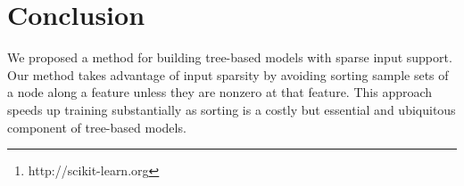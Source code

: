 \documentclass{acm_proc_article-sp}
\begin{document}
\maketitle
\begin{abstract}
  Many machine learning tasks such as text annotation usually require
  training over very big datasets, e.g., millions of web documents,
  that can be represented in a sparse input space. State-of-the-art
  tree-based ensemble algorithms cannot scale to such datasets, since
  they include operations whose running time is a function of the
  input space size rather than a function of the non-zero input
  elements. 
  In this paper, we propose an efficient splitting algorithm to
  leverage input sparsity within decision tree
  methods. 
  Our algorithm improves training time over sparse datasets by more
  than two orders of magnitude and it will be incorporated in the next
  version of \emph{scikit-learn}\footnote{http://scikit-learn.org},
  the most popular open source Python machine learning library.
\end{abstract}












\section{Conclusion}
\label{sec:conclusion}
We proposed a method for building tree-based models with sparse input
support.  Our method takes advantage of input sparsity by avoiding
sorting sample sets of a node along a feature unless they are nonzero
at that feature. This approach speeds up training substantially as
sorting is a costly but essential and ubiquitous component of
tree-based models.
\end{document}
